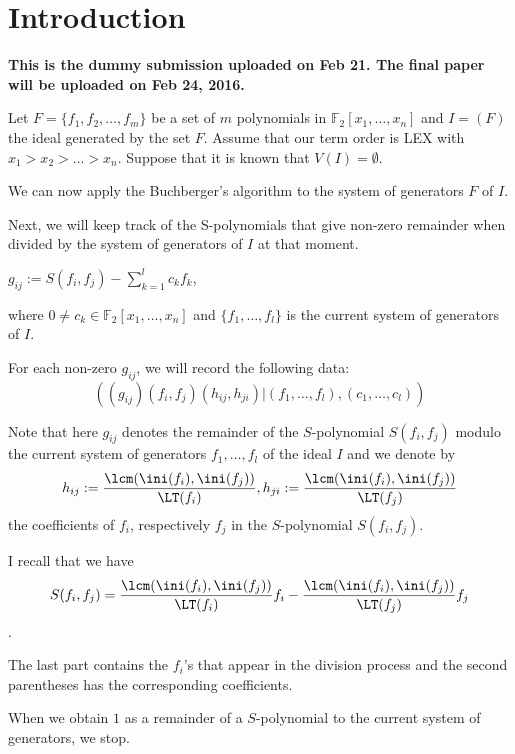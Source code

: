\section{Introduction}

{\bf This is the dummy submission uploaded on Feb 21. The final paper will be uploaded on Feb 24, 2016.}


Let $F=\{f_1,f_2,\ldots,f_m\}$ be a set of $m$ polynomials in $\mathbb{F}_2[x_1,\ldots,x_n]$ and $I=(F)$ the ideal generated by the set $F$. Assume that our term order is LEX with $x_1>x_2>...>x_n$. Suppose that it is known that $V(I)=\emptyset$.
 
We can now apply the Buchberger's algorithm \cite{HH} to the system of generators $F$ of $I$.
 
Next, we will keep track of the S-polynomials that give non-zero remainder when divided by the system of generators of $I$ at that moment.
\begin{center}
$g_{ij}:= S(f_i,f_j)-\displaystyle\sum_{k=1}^l c_kf_k$,
\end{center}
where $0\neq c_k\in\mathbb{F}_2[x_1,\ldots,x_n]$ and $\{f_1,\ldots,f_l\}$ is the current system of generators of $I$.

For each non-zero $g_{ij}$, we will record the following data:
$$((g_{ij})(f_i,f_j)(h_{ij},h_{ji})| (f_1,\ldots,f_l),(c_1,\ldots,c_l))$$


 Note that here $g_{ij}$ denotes the remainder of the $S$-polynomial $S(f_i,f_j)$ modulo the current system of generators $f_1,\ldots,f_l$ of the ideal $I$ and we denote by 
$$h_{ij}:=\displaystyle\frac{\lcm(\ini(f_i),\ini(f_j))}{\LT(f_i)}, h_{ji}:=\displaystyle\frac{\lcm(\ini(f_i),\ini(f_j))}{\LT(f_j)}$$
the coefficients of $f_i$, respectively $f_j$ in the $S$-polynomial $S(f_i,f_j)$.


I recall that we have $$S(f_i,f_j)=\displaystyle\frac{\lcm(\ini(f_i),\ini(f_j))}{\LT(f_i)}f_i-\frac{\lcm(\ini(f_i),\ini(f_j))}{\LT(f_j)}f_j$$.

The last part contains the $f_i$'s that appear in the division process and the second parentheses has the corresponding coefficients.

 When we obtain $1$ as a remainder of a $S$-polynomial to the current system of generators, we stop.

